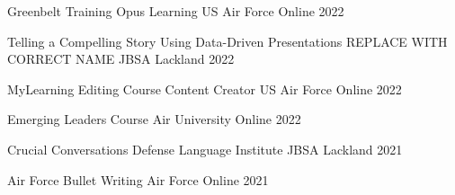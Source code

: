 



\begin{cvhonors}

\cvhonor
{Greenbelt Training} %
{Opus Learning US Air Force} %
{Online} %
{2022} %

\cvhonor
{Telling a Compelling Story Using Data-Driven Presentations} %
{REPLACE WITH CORRECT NAME} %
{JBSA Lackland} %
{2022} %

\cvhonor
{MyLearning Editing Course Content Creator} %
{US Air Force} %
{Online} %
{2022} %

\cvhonor
{Emerging Leaders Course} %
{Air University} %
{Online} %
{2022} %

\cvhonor
{Crucial Conversations} %
{Defense Language Institute} %
{JBSA Lackland} %
{2021} %

\cvhonor
{Air Force Bullet Writing} %
{Air Force} %
{Online} %
{2021} %

\end{cvhonors}
